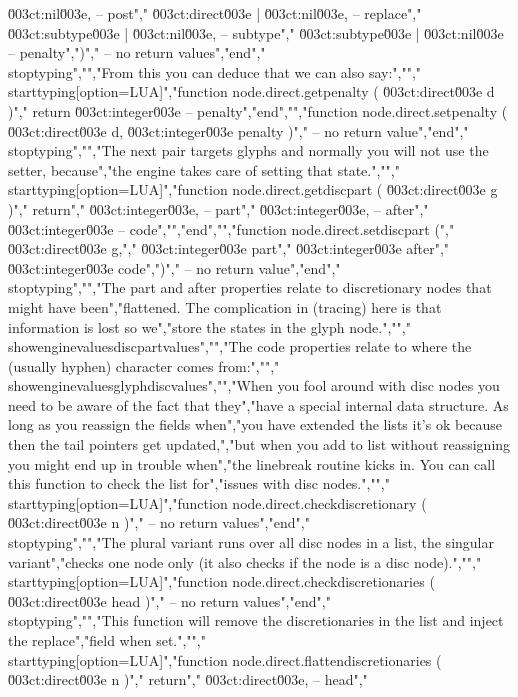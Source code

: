 \u003ct:nil\u003e, -- post","    \u003ct:direct\u003e  | \u003ct:nil\u003e, -- replace","    \u003ct:subtype\u003e | \u003ct:nil\u003e, -- subtype","    \u003ct:subtype\u003e | \u003ct:nil\u003e  -- penalty",")","    -- no return values","end","\\stoptyping","","From this you can deduce that we can also say:","","\\starttyping[option=LUA]","function node.direct.getpenalty ( \u003ct:direct\u003e d )","    return \u003ct:integer\u003e -- penalty","end","","function node.direct.setpenalty ( \u003ct:direct\u003e d, \u003ct:integer\u003e penalty )","    -- no return value","end","\\stoptyping","","The next pair targets glyphs and normally you will not use the setter, because","the engine takes care of setting that state.","","\\starttyping[option=LUA]","function node.direct.getdiscpart ( \u003ct:direct\u003e g )","    return","        \u003ct:integer\u003e, -- part","        \u003ct:integer\u003e, -- after","        \u003ct:integer\u003e  -- code","","end","","function node.direct.setdiscpart (","    \u003ct:direct\u003e  g,","    \u003ct:integer\u003e part","    \u003ct:integer\u003e after","    \u003ct:integer\u003e code",")","    -- no return value","end","\\stoptyping","","The part and after properties relate to discretionary nodes that might have been","flattened. The complication in (tracing) here is that information is lost so we","store the states in the glyph node.","","\\showenginevalues{discpartvalues}","","The code properties relate to where the (usually hyphen) character comes from:","","\\showenginevalues{glyphdiscvalues}","","When you fool around with disc nodes you need to be aware of the fact that they","have a special internal data structure. As long as you reassign the fields when","you have extended the lists it's ok because then the tail pointers get updated,","but when you add to list without reassigning you might end up in trouble when","the linebreak routine kicks in. You can call this function to check the list for","issues with disc nodes.","","\\starttyping[option=LUA]","function node.direct.checkdiscretionary ( \u003ct:direct\u003e n )","    -- no return values","end","\\stoptyping","","The plural variant runs over all disc nodes in a list, the singular variant","checks one node only (it also checks if the node is a disc node).","","\\starttyping[option=LUA]","function node.direct.checkdiscretionaries ( \u003ct:direct\u003e head )","    -- no return values","end","\\stoptyping","","This function will remove the discretionaries in the list and inject the replace","field when set.","","\\starttyping[option=LUA]","function node.direct.flattendiscretionaries ( \u003ct:direct\u003e n )","    return","        \u003ct:direct\u003e, -- head","        
